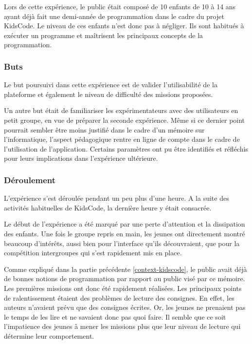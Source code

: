 Lors de cette expérience, le public était composé de 10 enfants de 10 à 14 ans ayant déjà fait une demi-année de programmation dans le cadre du projet KidsCode. Le niveau de ces enfants n'est donc pas à négliger. Ils sont habitués à exécuter un programme et maîtrisent les principaux concepts de la programmation.

\subsubsection{Buts}
Le but poursuivi dans cette expérience est de valider l'utilisabilité de la plateforme et également le niveau de difficulté des missions proposées. 

Un autre but était de familiariser les expérimentateurs avec des utilisateurs en petit groupe, en vue de préparer la seconde expérience.
Même si ce dernier point pourrait sembler être moins justifié dans le cadre d'un mémoire sur l'informatique, l'aspect pédagogique rentre en ligne de compte dans le cadre de l'utilisation de l'application. Certains paramètres ont pu être identifiés et réfléchis pour leurs implications dans l'expérience ultérieure.

\subsubsection{Déroulement}
L'expérience s'est déroulée pendant un peu plus d'une heure. A la suite des activités habituelles de KidsCode, la dernière heure y était consacrée. 

Le début de l'expérience a été marqué par une perte d'attention et la dissipation des enfants. Une fois le groupe repris en main, les jeunes ont directement montré beaucoup d'intérêts, aussi bien pour l'interface qu'ils découvraient, que pour la compétition intergroupes qui s'est rapidement mis en place.

Comme expliqué dans la partie précédente \ref{context-kidscode}, le public avait déjà de bonnes notions de programmation par rapport au public visé par ce mémoire. Les premières missions ont donc été rapidement réalisées. Les principaux points de ralentissement étaient des problèmes de lecture des consignes. En effet, les auteurs n'avaient prévu que des consignes écrites. Or, les jeunes ne prenaient pas le temps de les lire et ne savaient donc pas quoi faire. Il semble que ce soit l'impatience des jeunes à mener les missions plus que leur niveau de lecture qui détermine leur comportement.

